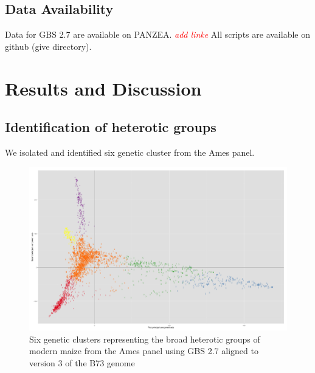 \documentclass[9pt,twocolumn,twoside]{gsajnl}
\newcommand{\jri}[1]{\textcolor{red}{ \emph{ #1}} }
\begin{document}
\subsection*{Data Availability}

Data for GBS 2.7 are available on PANZEA.\jri{add linke} All scripts are available on github (give directory).




\section*{Results and Discussion}

\subsection{Identification of heterotic groups}
We isolated and identified six genetic cluster from the Ames panel.
\begin{figure}[htbp]
\centering
\includegraphics[width=\linewidth]{6_clusters_placeholder.png}
\caption{Six genetic clusters representing the broad heterotic groups of modern maize from the Ames panel using GBS 2.7 aligned to version 3 of the B73 genome 
}
\label{fig:6clusters}
\end{figure}
\end{document}
